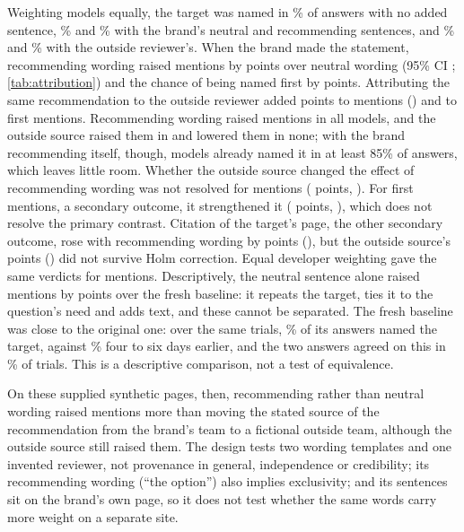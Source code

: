 Weighting models equally, the target was named in \AttrRateB\% of answers with no added sentence, \AttrRateSZero\% and
\AttrRateSOne\% with the brand's neutral and recommending sentences, and \AttrRateQZero\% and \AttrRateQOne\% with the
outside reviewer's. When the brand made the statement, recommending wording raised mentions by \AttrRecU{} points over
neutral wording (95\% CI \AttrRecCI; \cref{tab:attribution}) and the chance of being named first by \AttrTopRecU{}
points. Attributing the same recommendation to the outside reviewer added \AttrExtU{} points to mentions (\AttrExtCI)
and \AttrTopExtU{} to first mentions. Recommending wording raised mentions in all \AttrNModelsW{} models, and the outside
source raised them in \AttrExtPosW{} and lowered them in none; with the brand recommending itself, though,
\AttrSOneHighW{} models already named it in at least 85\% of answers, which leaves little room. Whether the outside
source changed the effect of recommending wording was not resolved for mentions (\AttrIntU{} points, \AttrIntCI). For
first mentions, a secondary outcome, it strengthened it (\AttrTopIntU{} points, \AttrTopIntCI), which does not resolve
the primary contrast. Citation of the target's page, the other secondary outcome, rose with recommending wording by
\AttrCitRecU{} points (\AttrCitRecCI), but the outside source's \AttrCitExtU{} points (\AttrCitExtCI) did not survive
Holm correction. Equal developer weighting gave the same verdicts for mentions. Descriptively, the neutral sentence
alone raised mentions by \AttrSZeroVBU{} points over the fresh baseline: it repeats the target, ties it to the question's
need and adds text, and these cannot be separated. The fresh baseline was close to the original one: over the same
\AttrBasePairs{} trials, \AttrBaseNew\% of its answers named the target, against \AttrBaseOld\% four to six days earlier,
and the two answers agreed on this in \AttrBaseAgree\% of trials. This is a descriptive comparison, not a test of
equivalence.

On these supplied synthetic pages, then, recommending rather than neutral wording raised mentions more than moving the
stated source of the recommendation from the brand's team to a fictional outside team, although the outside source
still raised them. The design tests two wording templates and one invented reviewer, not provenance in general,
independence or credibility; its recommending wording (``the option'') also implies exclusivity; and its sentences sit
on the brand's own page, so it does not test whether the same words carry more weight on a separate site.

